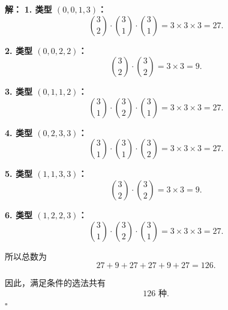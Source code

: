 \documentclass[11pt,a4paper,fontset=fandol]{ctexart}
\theoremstyle{formalexample}
\newenvironment{solution}{\par\noindent\textbf{解：}}{\hfill$\square$\par}
\begin{document}
\begin{enumerate}
\begin{solution}
  \textbf{1. 类型 $(0,0,1,3)$：}
  \[
  \binom32\cdot \binom31\cdot \binom31=3\times 3\times 3=27.
  \]

  \textbf{2. 类型 $(0,0,2,2)$：}
  \[
  \binom32\cdot \binom32=3\times 3=9.
  \]

  \textbf{3. 类型 $(0,1,1,2)$：}
  \[
  \binom31\cdot \binom32\cdot \binom31=3\times 3\times 3=27.
  \]

  \textbf{4. 类型 $(0,2,3,3)$：}
  \[
  \binom31\cdot \binom31\cdot \binom32=3\times 3\times 3=27.
  \]

  \textbf{5. 类型 $(1,1,3,3)$：}
  \[
  \binom32\cdot \binom32=3\times 3=9.
  \]

  \textbf{6. 类型 $(1,2,2,3)$：}
  \[
  \binom31\cdot \binom32\cdot \binom31=3\times 3\times 3=27.
  \]

  所以总数为
  \[
  27+9+27+27+9+27=126.
  \]

  因此，满足条件的选法共有
  \[
  \boxed{126\text{ 种}}.
  \]
  \end{solution}
\end{enumerate}
\end{document}
